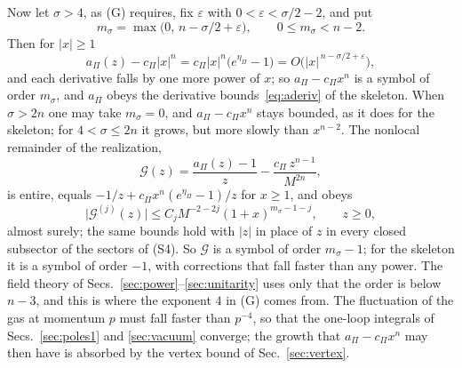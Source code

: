 \documentclass[aps,prd,10pt,twocolumn,superscriptaddress,nofootinbib,floatfix,longbibliography]{revtex4-2}
\begin{document}
Now let $\sigma>4$, as (G) requires, fix $\varepsilon$ with $0<\varepsilon<\sigma/2-2$, and put
\begin{equation}
\label{eq:msigma}
m_\sigma=\max\bigl(0,\,n-\sigma/2+\varepsilon\bigr),\qquad 0\le m_\sigma<n-2 .
\end{equation}
Then for $|x|\ge1$
\[
a_\Pi(z)-c_\Pi|x|^n=c_\Pi|x|^n\bigl(e^{\eta_\Pi}-1\bigr)=O\bigl(|x|^{\,n-\sigma/2+\varepsilon}\bigr),
\]
and each derivative falls by one more power of $x$; so $a_\Pi-c_\Pi x^n$ is a symbol of order $m_\sigma$, and $a_\Pi$ obeys the derivative bounds~\eqref{eq:aderiv} of the skeleton. When $\sigma>2n$ one may take $m_\sigma=0$, and $a_\Pi-c_\Pi x^n$ stays bounded, as it does for the skeleton; for $4<\sigma\le2n$ it grows, but more slowly than $x^{n-2}$. The nonlocal remainder of the realization,
\begin{equation}
\label{eq:G}
\mathcal G(z)=\frac{a_\Pi(z)-1}{z}-\frac{c_\Pi\,z^{n-1}}{M^{2n}},
\end{equation}
is entire, equals $-1/z+c_\Pi x^n(e^{\eta_\Pi}-1)/z$ for $x\ge1$, and obeys
\begin{equation}
\label{eq:Gsymbol}
\bigl|\mathcal G^{(j)}(z)\bigr|\le C_jM^{-2-2j}(1+x)^{m_\sigma-1-j},\qquad z\ge0 ,
\end{equation}
almost surely; the same bounds hold with $|z|$ in place of $z$ in every closed subsector of the sectors of (S4). So $\mathcal G$ is a symbol of order $m_\sigma-1$; for the skeleton it is a symbol of order $-1$, with corrections that fall faster than any power. The field theory of Secs.~\ref{sec:power}--\ref{sec:unitarity} uses only that the order is below $n-3$, and this is where the exponent $4$ in (G) comes from. The fluctuation of the gas at momentum $p$ must fall faster than $p^{-4}$, so that the one-loop integrals of Secs.~\ref{sec:poles1} and \ref{sec:vacuum} converge; the growth that $a_\Pi-c_\Pi x^n$ may then have is absorbed by the vertex bound of Sec.~\ref{sec:vertex}.
\end{document}
